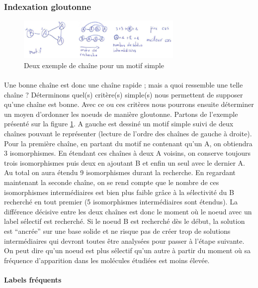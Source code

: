 \documentclass[12pt,french,twoside]{report}
\begin{document}
\subsubsection{Indexation gloutonne}

\begin{figure}
  \includegraphics[width=300px]{Figures/s2m/indexation/chaine_fail.pdf}
  \caption{\label{chaine_fail}Deux exemple de chaîne pour un motif simple}
\end{figure}

\paragraph{}Une bonne chaîne est donc une chaîne rapide ; mais a quoi ressemble une telle chaîne ? Déterminons quel(s) critère(s)
simple(s) nous permettent de supposer qu'une chaîne est bonne. Avec ce ou ces critères nous pourrons ensuite déterminer un
moyen d'ordonner les noeuds de manière gloutonne. Partons de l'exemple présenté sur la figure \ref{chaine_fail}. A gauche est
dessiné un motif simple suivi de deux chaînes pouvant le représenter (lecture de l'ordre des chaînes de gauche à droite). Pour
la première chaîne, en partant du motif ne contenant qu'un A, on obtiendra 3 isomorphismes. En étendant ces chaînes à deux A
voisins, on conserve toujours trois isomorphismes puis deux en ajoutant B et enfin un seul avec le dernier A. Au total on aura
étendu 9 isomorphismes durant la recherche. En regardant maintenant la seconde chaîne, on se rend compte que le nombre de ces
isomorphismes intermédiaires est bien plus faible grâce à la sélectivité du B recherché en tout premier (5 isomorphismes
intermédiaires sont étendus). La différence décisive entre les deux chaînes est donc le moment où le noeud avec un label sélectif
est recherché. Si le noeud B est recherché dès le début, la solution est ``ancrée'' sur une base solide et ne risque pas de 
créer trop de solutions intermédiaires qui devront toutes être analysées pour passer à l'étape suivante. On peut dire qu'un noeud
est plus sélectif qu'un autre à partir du moment où sa fréquence d'apparition dans les molécules étudiées est moins élevée.

\paragraph{Labels fréquents}
\end{document}
